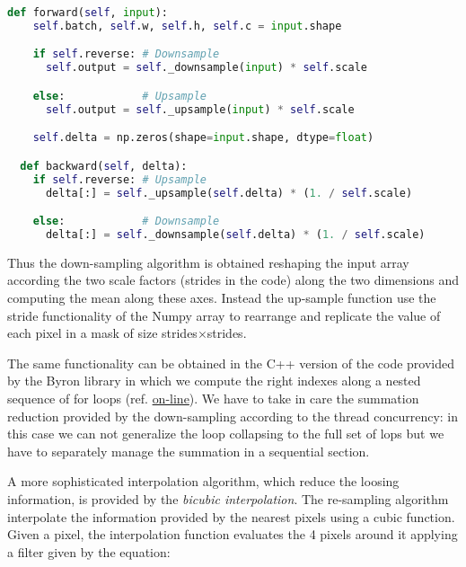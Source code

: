 \documentclass{standalone}
\begin{document}
\begin{lstlisting}[language=Python, caption=NumPyNet version of Upsampling function, label=code:py_upsample]
  def forward(self, input):
    self.batch, self.w, self.h, self.c = input.shape

    if self.reverse: # Downsample
      self.output = self._downsample(input) * self.scale

    else:            # Upsample
      self.output = self._upsample(input) * self.scale

    self.delta = np.zeros(shape=input.shape, dtype=float)

  def backward(self, delta):
    if self.reverse: # Upsample
      delta[:] = self._upsample(self.delta) * (1. / self.scale)

    else:            # Downsample
      delta[:] = self._downsample(self.delta) * (1. / self.scale)


\end{lstlisting}

Thus the down-sampling algorithm is obtained reshaping the input array according the two scale factors (\textsf{strides} in the code) along the two dimensions and computing the mean along these axes.
Instead the up-sample function use the stride functionality of the \textsf{Numpy} array to rearrange and replicate the value of each pixel in a mask of size \textsf{strides}$\times$\textsf{strides}.

The same functionality can be obtained in the \textsf{C++} version of the code provided by the \textsf{Byron} library in which we compute the right indexes along a nested sequence of for loops (ref. \href{https://github.com/Nico-Curti/Byron/blob/master/src/upsample_layer.cpp}{on-line}).
We have to take in care the summation reduction provided by the down-sampling according to the thread concurrency: in this case we can not generalize the loop collapsing to the full set of lops but we have to separately manage the summation in a sequential section.

A more sophisticated interpolation algorithm, which reduce the loosing information, is provided by the \emph{bicubic interpolation}.
The re-sampling algorithm interpolate the information provided by the nearest pixels using a cubic function.
Given a pixel, the interpolation function evaluates the 4 pixels around it applying a filter given by the equation:
\end{document}
